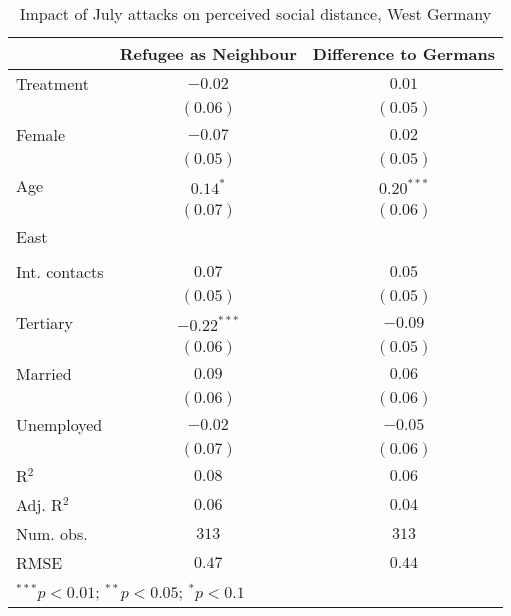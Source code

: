 
\begin{table}
\caption{Impact of July attacks on perceived social distance, West Germany}
\begin{center}
\begin{tabular}{l c c}
\toprule
 & Refugee as Neighbour & Difference to Germans \\
\midrule
Treatment     & $-0.02$       & $0.01$       \\
              & $(0.06)$      & $(0.05)$     \\
Female        & $-0.07$       & $0.02$       \\
              & $(0.05)$      & $(0.05)$     \\
Age           & $0.14^{*}$    & $0.20^{***}$ \\
              & $(0.07)$      & $(0.06)$     \\
East          &               &              \\
              &               &              \\
Int. contacts & $0.07$        & $0.05$       \\
              & $(0.05)$      & $(0.05)$     \\
Tertiary      & $-0.22^{***}$ & $-0.09$      \\
              & $(0.06)$      & $(0.05)$     \\
Married       & $0.09$        & $0.06$       \\
              & $(0.06)$      & $(0.06)$     \\
Unemployed    & $-0.02$       & $-0.05$      \\
              & $(0.07)$      & $(0.06)$     \\
\midrule
R$^2$         & $0.08$        & $0.06$       \\
Adj. R$^2$    & $0.06$        & $0.04$       \\
Num. obs.     & $313$         & $313$        \\
RMSE          & $0.47$        & $0.44$       \\
\bottomrule
\multicolumn{3}{l}{\scriptsize{$^{***}p<0.01$; $^{**}p<0.05$; $^{*}p<0.1$}}
\end{tabular}
\label{tab_dist_west}
\end{center}
\end{table}

